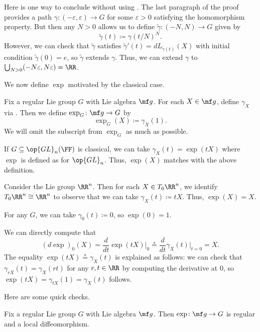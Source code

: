 \documentclass[../notes.tex]{subfiles}
\begin{document}
\begin{remark}
	Here is one way to conclude without using \cite[Theorem~9.18]{lee-manifolds}. The last paragraph of the proof provides a path $\gamma\colon(-\varepsilon,\varepsilon)\to G$ for some $\varepsilon>0$ satisfying the homomorphism property. But then any $N>0$ allows us to define $\widetilde\gamma\colon(-N,N)\to G$ given by
	\[\widetilde\gamma(t)\coloneqq\gamma(t/N)^N.\]
	However, we can check that $\widetilde\gamma$ satisfies $\widetilde\gamma'(t)=dL_{\widetilde\gamma(t)}(X)$ with initial condition $\widetilde\gamma(0)=e$, so $\widetilde\gamma$ extends $\gamma$. Thus, we can extend $\gamma$ to $\bigcup_{N>0}(-N\varepsilon,N\varepsilon)=\RR$.
\end{remark}
We now define $\exp$ motivated by the classical case.
\begin{definition}[exponential]
	Fix a regular Lie group $G$ with Lie algebra $\mf g$. For each $X\in\mf g$, define $\gamma_X$ via . Then we define $\exp_G\colon\mf g\to G$ by
	\[\exp_G(X)\coloneqq\gamma_X(1).\]
	We will omit the subscript from $\exp_G$ as much as possible.
\end{definition}
\begin{example}
	If $G\subseteq\op{GL}_n(\FF)$ is classical, we can take $\gamma_X(t)=\exp(tX)$ where $\exp$ is defined as for $\op{GL}_n$. Thus, $\exp(X)$ matches with the above definition.
\end{example}
\begin{example}
	Consider the Lie group $\RR^n$. Then for each $X\in T_0\RR^n$, we identify $T_0\RR^n\cong\RR^n$ to observe that we can take $\gamma_X(t)\coloneqq tX$. Thus, $\exp(X)=X$.
\end{example}
\begin{example}
	For any $G$, we can take $\gamma_0(t)\coloneqq0$, so $\exp(0)=1$.
\end{example}
\begin{example} \label{ex:derivative-of-exp}
	We can directly compute that
	\[(d\exp)_0(X)=\frac d{dt}\exp(tX)\bigg|_0\stackrel*=\frac d{dt}\gamma_X(t)\bigg|_{t=0}=X.\]
	The equality $\exp(tX)\stackrel*=\gamma_X(t)$ is explained as follows: we can check that $\gamma_{rX}(t)=\gamma_X(rt)$ for any $r,t\in\RR$ by computing the derivative at $0$, so $\exp(tX)=\gamma_{tX}(1)=\gamma_X(t)$ follows.
\end{example}
Here are some quick checks.
\begin{proposition} \label{prop:exp-regular}
	Fix a regular Lie group $G$ with Lie algebra $\mf g$. Then $\exp\colon\mf g\to G$ is regular and a local diffeomorphism.
\end{proposition}
\end{document}
